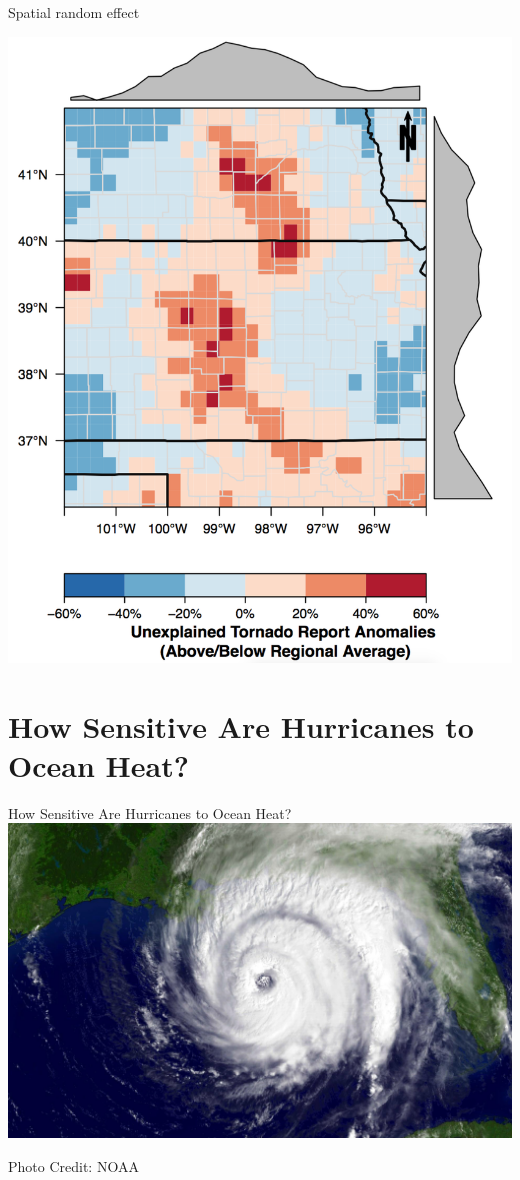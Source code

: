 \documentclass[handout]{beamer}
\begin{document}
\begin{frame}{Spatial random effect}
\begin{center}
\includegraphics[scale=.18]{figures/Unexplained.png}
\end{center}
\end{frame}

\section{How Sensitive Are Hurricanes to Ocean Heat?}

\begin{frame}
\begin{center}
{\Large How Sensitive Are Hurricanes to Ocean Heat?}\\
\vspace{.5cm}
\includegraphics[scale=.14]{figures/ivan091504-1515z.jpg}
\end{center}
{\footnotesize Photo Credit: NOAA}
\end{frame}
\end{document}
